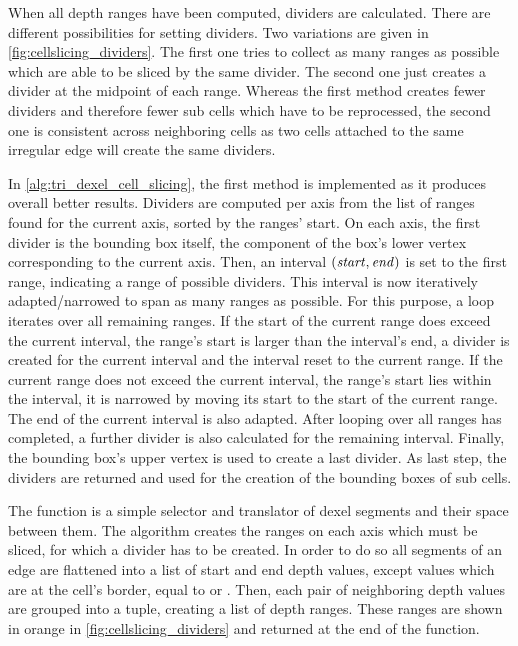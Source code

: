 When all depth ranges have been computed, dividers are calculated.
There are different possibilities for setting dividers.
Two variations are given in \cref{fig:cellslicing_dividers}.
The first one tries to collect as many ranges as possible which are able to be sliced by the same divider.
The second one just creates a divider at the midpoint of each range.
Whereas the first method creates fewer dividers and therefore fewer sub cells which have to be reprocessed, the second one is consistent across neighboring cells as two cells attached to the same irregular edge will create the same dividers.

In \cref{alg:tri_dexel_cell_slicing}, the first method is implemented as it produces overall better results.
Dividers are computed per axis from the list of ranges found for the current axis, sorted by the ranges' start.
On each axis, the first divider is the bounding box itself, \ie the component of the box's lower vertex corresponding to the current axis.
Then, an interval $(\mathit{start}, \mathit{end})$ is set to the first range, indicating a range of possible dividers.
This interval is now iteratively adapted/narrowed to span as many ranges as possible.
For this purpose, a loop iterates over all remaining ranges.
If the start of the current range does exceed the current interval, \ie the range's start is larger than the interval's end, a divider is created for the current interval and the interval reset to the current range.
If the current range does not exceed the current interval, \ie the range's start lies within the interval, it is narrowed by moving its start to the start of the current range.
The end of the current interval is also adapted.
After looping over all ranges has completed, a further divider is also calculated for the remaining interval.
Finally, the bounding box's upper vertex is used to create a last divider.
As last step, the dividers are returned and used for the creation of the bounding boxes of sub cells.

The  function is a simple selector and translator of dexel segments and their space between them.
The algorithm creates the ranges on each axis which must be sliced, \ie for which a divider has to be created.
In order to do so all segments of an edge are flattened into a list of start and end depth values, except values which are at the cell's border, \ie equal to  or .
Then, each pair of neighboring depth values are grouped into a tuple, creating a list of depth ranges.
These ranges are shown in orange in \cref{fig:cellslicing_dividers} and returned at the end of the function.


